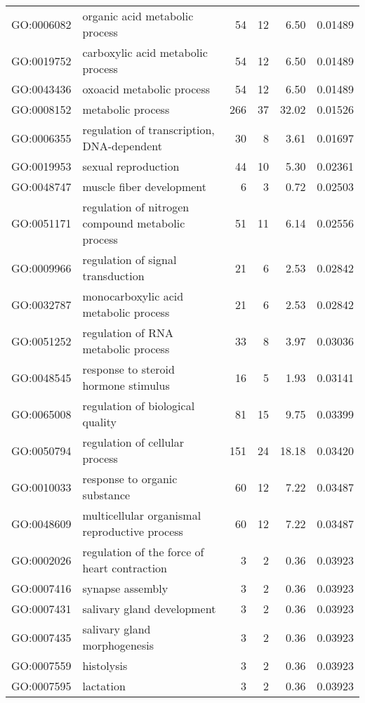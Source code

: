 \begin{longtable}{lp{4.5cm}rrrl}
  GO:0006082 & organic acid metabolic process &  54 &  12 & 6.50 & 0.01489 \\ 
  GO:0019752 & carboxylic acid metabolic process &  54 &  12 & 6.50 & 0.01489 \\ 
  GO:0043436 & oxoacid metabolic process &  54 &  12 & 6.50 & 0.01489 \\ 
  GO:0008152 & metabolic process & 266 &  37 & 32.02 & 0.01526 \\ 
  GO:0006355 & regulation of transcription, DNA-dependent &  30 &   8 & 3.61 & 0.01697 \\ 
  GO:0019953 & sexual reproduction &  44 &  10 & 5.30 & 0.02361 \\ 
  GO:0048747 & muscle fiber development &   6 &   3 & 0.72 & 0.02503 \\ 
  GO:0051171 & regulation of nitrogen compound metabolic process &  51 &  11 & 6.14 & 0.02556 \\ 
  GO:0009966 & regulation of signal transduction &  21 &   6 & 2.53 & 0.02842 \\ 
  GO:0032787 & monocarboxylic acid metabolic process &  21 &   6 & 2.53 & 0.02842 \\ 
  GO:0051252 & regulation of RNA metabolic process &  33 &   8 & 3.97 & 0.03036 \\ 
  GO:0048545 & response to steroid hormone stimulus &  16 &   5 & 1.93 & 0.03141 \\ 
  GO:0065008 & regulation of biological quality &  81 &  15 & 9.75 & 0.03399 \\ 
  GO:0050794 & regulation of cellular process & 151 &  24 & 18.18 & 0.03420 \\ 
  GO:0010033 & response to organic substance &  60 &  12 & 7.22 & 0.03487 \\ 
  GO:0048609 & multicellular organismal reproductive process &  60 &  12 & 7.22 & 0.03487 \\ 
  GO:0002026 & regulation of the force of heart contraction &   3 &   2 & 0.36 & 0.03923 \\ 
  GO:0007416 & synapse assembly &   3 &   2 & 0.36 & 0.03923 \\ 
  GO:0007431 & salivary gland development &   3 &   2 & 0.36 & 0.03923 \\ 
  GO:0007435 & salivary gland morphogenesis &   3 &   2 & 0.36 & 0.03923 \\ 
  GO:0007559 & histolysis &   3 &   2 & 0.36 & 0.03923 \\ 
  GO:0007595 & lactation &   3 &   2 & 0.36 & 0.03923 \\ 

\end{longtable}
